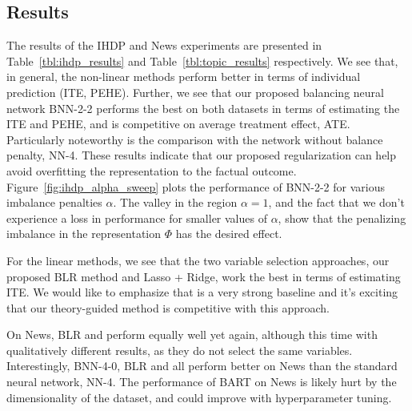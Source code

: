 \subsection{Results}
The results of the IHDP and News experiments are presented in Table~\ref{tbl:ihdp_results} and Table~\ref{tbl:topic_results} respectively. We see that, in general, the non-linear methods perform better in terms of individual prediction (ITE, PEHE). Further, we see that our proposed balancing neural network {\sc BNN-2-2} performs the best on both datasets in terms of estimating the ITE and PEHE, and is competitive on average treatment effect, ATE. Particularly noteworthy is the comparison with the network without balance penalty, {\sc NN-4}. These results indicate that our proposed regularization can help avoid overfitting the representation to the factual outcome. Figure~\ref{fig:ihdp_alpha_sweep} plots the performance of {\sc BNN-2-2} for various imbalance penalties $\alpha$. The valley in the region $\alpha=1$, and the fact that we don't experience a loss in performance for smaller values of $\alpha$, show that the penalizing imbalance in the representation $\Phi$ has the desired effect.

For the linear methods, we see that the two variable selection approaches, our proposed BLR method and {\sc Lasso + Ridge}, work the best in terms of estimating ITE. We would like to emphasize that \lridge{} is a very strong baseline and it's exciting that our theory-guided method is competitive with this approach.

On News, BLR and \lridge{} perform equally well yet again, although this time with qualitatively different results, as they do not select the same variables. Interestingly, BNN-4-0, BLR and \lridge{} all perform better on News than the standard neural network, NN-4. The performance of BART on News is likely hurt by the dimensionality of the dataset, and could improve with hyperparameter tuning.

